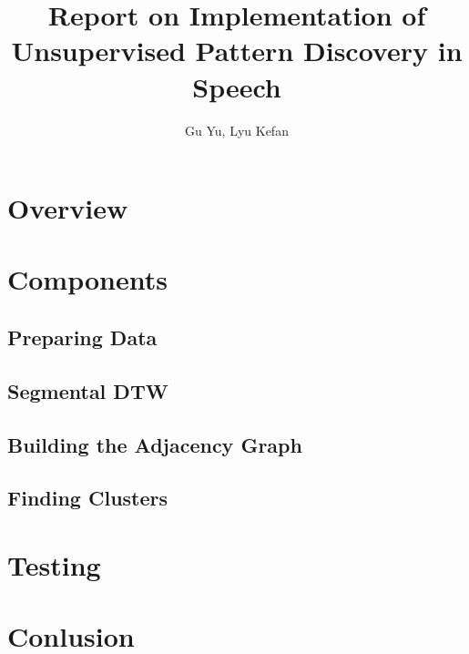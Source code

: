 \documentclass{article}
\title{Report on Implementation of Unsupervised Pattern Discovery in Speech}
\author{Gu Yu, Lyu Kefan}
\begin{document}
\maketitle

\section{Overview}

\section{Components}
    \subsection{Preparing Data}

    \subsection{Segmental DTW}

    \subsection{Building the Adjacency Graph}

    \subsection{Finding Clusters}

\section{Testing}

\section{Conlusion}
\end{document}
